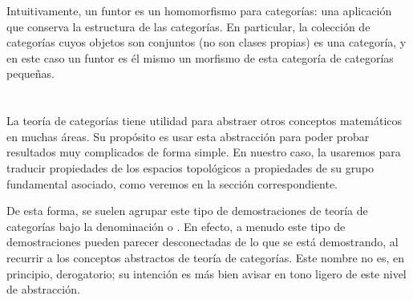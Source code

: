\begin{obs}
Intuitivamente, un funtor es un homomorfismo para categorías: una aplicación que conserva la estructura de las categorías. En particular, la colección de categorías cuyos objetos son conjuntos (no son clases propias) es una categoría, y en este caso un funtor es él mismo un morfismo de esta categoría de categorías pequeñas.
\end{obs}

\section{}

La teoría de categorías tiene utilidad para abstraer otros conceptos matemáticos en muchas áreas. Su propósito es usar esta abstracción para poder probar resultados muy complicados de forma simple. En nuestro caso, la usaremos para traducir propiedades de los espacios topológicos a propiedades de su grupo fundamental asociado, como veremos en la sección correspondiente.

De esta forma, se suelen agrupar este tipo de demostraciones de teoría de categorías bajo la denominación  o . En efecto, a menudo este tipo de demostraciones pueden parecer desconectadas de lo que se está demostrando, al recurrir a los conceptos abstractos de teoría de categorías. Este nombre no es, en principio, derogatorio; su intención es más bien avisar en tono ligero de este nivel de abstracción.